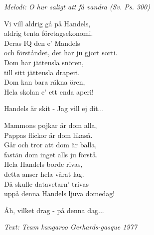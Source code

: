 {\footnotesize\textit{Melodi: O hur saligt att få vandra (Sv. Ps. 300)}}\par
\vspace{10pt}
\par
Vi vill aldrig gå på Handels,\\
aldrig tenta företagsekonomi.\\
Deras IQ den e' Mandels\\
och förståndet, det har ju gjort sorti.\\
Dom har jätteusla snören,\\
till sitt jätteusla draperi.\\
Dom kan bara räkna ören,\\
Hela skolan e' ett enda aperi!\par
\vspace{10pt}
Handels är skit - Jag vill ej dit...\par
\vspace{10pt}
Mammons pojkar är dom alla,\\
Pappas flickor är dom likaså.\\
Går och tror att dom är balla,\\
fastän dom inget alls ju förstå.\\
Hela Handels borde rivas,\\
detta anser hela vårat lag.\\
Då skulle datavetarn' trivas\\
uppå denna Handels ljuva domedag!\par
\vspace{10pt}
Åh, vilket drag - på denna dag...\par
\vspace{10pt}
{\footnotesize\textit{Text: Team kangaroo Gerhards-gasque 1977}}
